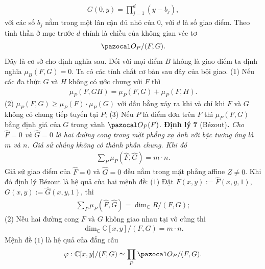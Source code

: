 \begin{multicols}{2}
	\begin{align*}
		G(0,y)=\prod_{j=1}^d(y-b_j),
	\end{align*}
	với các số $b_j$ nằm trong một lân cận đủ nhỏ của $0$, với $d$ là số giao điểm. Theo tinh thần ở mục trước $d$ chính là chiều của không gian véc tơ
	\begin{align*}
		\pazocal O_P/(F,G).
	\end{align*}
	Đây là cơ sở cho định nghĩa sau.
	\vskip 0.1cm
	Đối với mọi điểm $B$ không là giao điểm ta định nghĩa
	$\mu_B(F,G)=0.$ 
	Ta có các tính  chất cơ bản sau đây của bội giao. 
	\vskip 0.1cm
	($1$) Nếu các đa thức $G$ và $H$ không có ước chung với $F$ thì 
	\begin{align*}
		\mu_P(F,GH)=\mu_P(F,G)+\mu_P(F,H).
	\end{align*}
	($2$) $\mu_P(F,G)\geq \mu_P(F)\cdot \mu_P(G)$ với dấu bằng xảy ra khi và chỉ khi $F$ và $G$ không có chung tiếp tuyến tại $P$;
	\vskip 0.1cm
	($3$) Nếu $P$ là điểm đơn trên $F$  thì $\mu_P(F,G)$ bằng định giá của $G$ trong vành $\pazocal O_P(F)$. 
	\vskip 0.1cm
	\textbf{\color{duongvaotoanhoc}Định lý} $\pmb{7}$ (Bézout)\textbf{\color{duongvaotoanhoc}.} \textit{Cho $\widehat F=0$ và $\widehat G=0$ là hai đường cong  trong mặt phẳng xạ ảnh với bậc tương ứng là $m$ và $n$. Giả sử chúng không có thành phần chung. Khi đó}
	\begin{align*}
		\sum_P\mu_P(\widehat F,\widehat G)=m\cdot n.
	\end{align*}
	Giả sử giao điểm của  $\widehat F=0$ và $\widehat G=0$ đều nằm trong mặt phẳng affine $Z\neq 0$. 
	Khi đó  định lý Bézout là hệ quả của hai mệnh đề:
	\vskip 0.1cm
	($1$) Đặt $F(x,y):=\widehat F(x,y,1)$, $G(x,y):=\widehat G(x,y,1)$, thì 
		\begin{align*}
			\sum_P\mu_P(\widehat F,\widehat G)=\dim_{\mathbb C}R/(F,G);
		\end{align*}
	($2$) Nếu hai đường cong $F$  và $G$  không giao nhau tại vô cùng thì 
		\begin{align*}
			\dim_{\mathbb C}\mathbb C[x,y]/(F,G)= m\cdot n.
		\end{align*}
	Mệnh đề ($1$) là hệ quả của đẳng cấu
	\begin{align*}
		\varphi:\mathbb C[x,y]/(F,G)\simeq \prod_P \pazocal O_P/(F,G).
	\end{align*}

\end{multicols}
